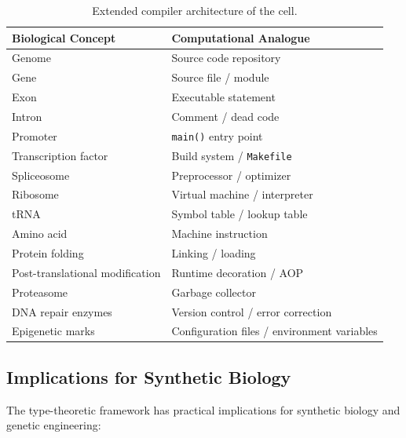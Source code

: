\documentclass[12pt,a4paper]{article}
\theoremstyle{definition}
\begin{document}
\begin{table}[H]
\centering
\caption{Extended compiler architecture of the cell.}
\label{tab:extended-correspondence}
\begin{tabular}{ll}
\toprule
\textbf{Biological Concept} & \textbf{Computational Analogue} \\
\midrule
Genome                      & Source code repository \\
Gene                        & Source file / module \\
Exon                        & Executable statement \\
Intron                      & Comment / dead code \\
Promoter                    & \texttt{main()} entry point \\
Transcription factor        & Build system / \texttt{Makefile} \\
Spliceosome                 & Preprocessor / optimizer \\
Ribosome                    & Virtual machine / interpreter \\
tRNA                        & Symbol table / lookup table \\
Amino acid                  & Machine instruction \\
Protein folding             & Linking / loading \\
Post-translational modification & Runtime decoration / AOP \\
Proteasome                  & Garbage collector \\
DNA repair enzymes          & Version control / error correction \\
Epigenetic marks            & Configuration files / environment variables \\
\bottomrule
\end{tabular}
\end{table}

\subsection{Implications for Synthetic Biology}

The type-theoretic framework has practical implications for synthetic biology and genetic engineering:
\end{document}
